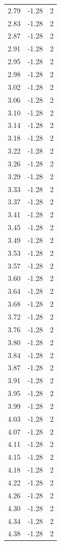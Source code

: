 \begin{longtable}{lrr}
  2.79 & -1.28 & 2 \\
  2.83 & -1.28 & 2 \\
  2.87 & -1.28 & 2 \\
  2.91 & -1.28 & 2 \\
  2.95 & -1.28 & 2 \\
  2.98 & -1.28 & 2 \\
  3.02 & -1.28 & 2 \\
  3.06 & -1.28 & 2 \\
  3.10 & -1.28 & 2 \\
  3.14 & -1.28 & 2 \\
  3.18 & -1.28 & 2 \\
  3.22 & -1.28 & 2 \\
  3.26 & -1.28 & 2 \\
  3.29 & -1.28 & 2 \\
  3.33 & -1.28 & 2 \\
  3.37 & -1.28 & 2 \\
  3.41 & -1.28 & 2 \\
  3.45 & -1.28 & 2 \\
  3.49 & -1.28 & 2 \\
  3.53 & -1.28 & 2 \\
  3.57 & -1.28 & 2 \\
  3.60 & -1.28 & 2 \\
  3.64 & -1.28 & 2 \\
  3.68 & -1.28 & 2 \\
  3.72 & -1.28 & 2 \\
  3.76 & -1.28 & 2 \\
  3.80 & -1.28 & 2 \\
  3.84 & -1.28 & 2 \\
  3.87 & -1.28 & 2 \\
  3.91 & -1.28 & 2 \\
  3.95 & -1.28 & 2 \\
  3.99 & -1.28 & 2 \\
  4.03 & -1.28 & 2 \\
  4.07 & -1.28 & 2 \\
  4.11 & -1.28 & 2 \\
  4.15 & -1.28 & 2 \\
  4.18 & -1.28 & 2 \\
  4.22 & -1.28 & 2 \\
  4.26 & -1.28 & 2 \\
  4.30 & -1.28 & 2 \\
  4.34 & -1.28 & 2 \\
  4.38 & -1.28 & 2 \\

\end{longtable}
